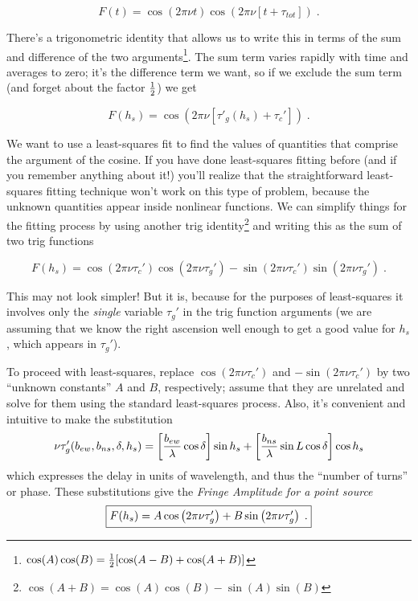 \documentclass[11pt,preprint]{aastex}
\begin{document}
\begin{equation}
 F(t) = \cos (2 \pi \nu t) \cos (2 \pi \nu [t + \tau_{tot}]) \; . 
\end{equation}


\noindent There's a trigonometric identity that allows us to write this
in terms of the sum and difference of the two
arguments\footnote{$\cos(A) \cos(B)= {1 \over 2}[\cos(A-B) +
\cos(A+B)]$}. The sum term varies rapidly with time and averages to zero;
it's the difference term we want, so if we exclude the sum term (and
forget about the factor $1 \over 2$) we get

\begin{equation}
 F(h_s) = \cos (2 \pi \nu [\tau'_{g}(h_s) + \tau_c']) \; . 
\end{equation}


	We want to use a least-squares fit to find the values of
quantities that comprise the argument of the cosine.  If you have done
least-squares fitting before (and if you remember anything about it!)
you'll realize that the straightforward least-squares fitting technique
won't work on this type of problem, because the unknown quantities
appear inside nonlinear functions.  We can simplify things for the
fitting process by using another trig identity\footnote{$\cos(A+B) =
\cos(A)\cos(B) - \sin(A)\sin(B)$} and writing this as the
sum of two trig functions

\begin{equation}
 F(h_s) = \cos(2 \pi \nu \tau_c') \cos \left(2 \pi \nu \tau_g' \right) - 
          \sin(2 \pi \nu \tau_c') \sin \left(2 \pi \nu \tau_g' \right) \; .  
\end{equation}

\noindent This may not look simpler! But it is, because for the purposes
of least-squares it involves only the {\it single} variable $\tau_g'$ in
the trig function arguments (we are assuming that we know the right
ascension well enough to get a good value for $h_s$, which appears in
$\tau_g'$).

	To proceed with least-squares, replace $\cos (2 \pi \nu \tau_c')$
and $-\sin (2 \pi \nu \tau_c')$ by two ``unknown constants'' $A$ and $B$,
respectively; assume that they are unrelated and solve for them using
the standard least-squares process. Also, it's convenient and intuitive
to make the substitution 
%
\begin{equation} \label{nutau}
\nu \tau_g'(b_{ew}, b_{ns}, \delta, h_s) = \left[{b_{ew} \over \lambda} \cos \delta \right] \sin h_s 
  + \left[{b_{ns} \over \lambda} \sin L \cos \delta \right] \cos h_s
\end{equation}
%
\noindent which expresses the delay in units of wavelength, and thus the
``number of turns'' or phase. These substitutions give the {\it Fringe
  Amplitude for a point source}
%
\begin{equation} \label{fringeresponse} \fbox{$
 F(h_s) = A \cos \left(2 \pi \nu \tau_g' \right) 
         +B \sin \left(2 \pi \nu \tau_g' \right) \; . 
$}
\end{equation}
\end{document}
